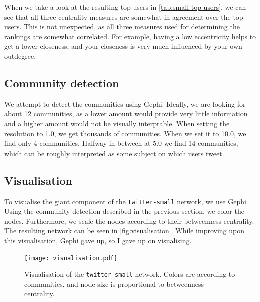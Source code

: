 \documentclass[a4paper,10pt,hidelinks]{article}
\begin{document}
When we take a look at the resulting top-users in \autoref{tab:small-top-users}, we can see that all three centrality measures are somewhat in agreement over the top users. This is not unexpected, as all three measures used for determining the rankings are somewhat correlated. For example, having a low eccentricity helps to get a lower closeness, and your closeness is very much influenced by your own outdegree.

\subsection{Community detection}
We attempt to detect the communities using Gephi. Ideally, we are looking for about 12 communities, as a lower amount would provide very little information and a higher amount would not be visually interprable. When setting the resolution to 1.0, we get thousands of communities. When we set it to 10.0, we find only 4 communities. Halfway in between at 5.0 we find 14 communities, which can be roughly interpreted as some subject on which users tweet.

\subsection{Visualisation}
To visualise the giant component of the \texttt{twitter-small} network, we use Gephi. Using the community detection described in the previous section, we color the nodes. Furthermore, we scale the nodes according to their betweenness centrality. The resulting network can be seen in \autoref{fig:visualisation}. While improving upon this visualisation, Gephi gave up, so I gave up on visualising.

\begin{figure}
	\centering
	\texttt{[image: visualisation.pdf]}
	\caption{Visualisation of the \texttt{twitter-small} network. Colors are according to communities, and node size is proportional to betweenness centrality.}
	\label{fig:visualisation}
\end{figure}
\end{document}
